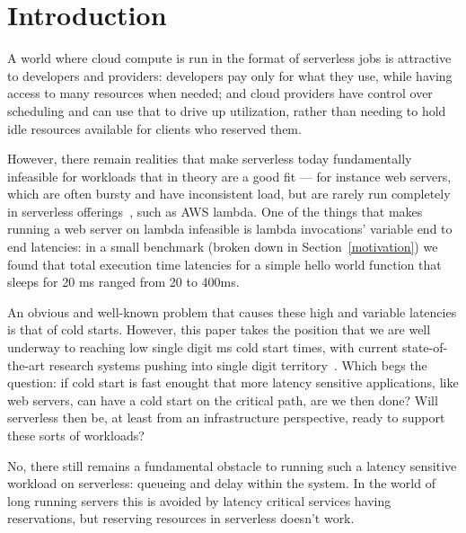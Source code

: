 \section{Introduction}

A world where cloud compute is run in the format of serverless jobs is
attractive to developers and providers: developers pay only for what they use,
while having access to many resources when needed; and cloud providers have
control over scheduling and can use that to drive up utilization, rather than
needing to hold idle resources available for clients who reserved them.


However, there remain realities that make serverless today fundamentally
infeasible for workloads that in theory are a good fit --- for instance web
servers, which are often bursty and have inconsistent load, but are rarely run
completely in serverless offerings~\cite{reddit-serverless1}, such as AWS lambda.
One of the things that makes running a web server on lambda infeasible is lambda
invocations' variable end to end latencies: in a small benchmark (broken down in
Section~\ref{motivation}) we found that total execution time latencies for a
simple hello world function that sleeps for 20 ms ranged from 20 to 400ms.

An obvious and well-known problem that causes these high and variable latencies
is that of cold starts. However, this paper takes the position that we are well
underway to reaching low single digit ms cold start times, with current
state-of-the-art research systems pushing into single digit
territory~\cite{sigmaos,mitosis}. Which begs the question: if cold start is fast enought
that more latency sensitive applications, like web servers, can have a cold
start on the critical path, are we then done? Will serverless then be, at least
from an infrastructure perspective, ready to support these sorts of workloads?

No, there still remains a fundamental obstacle to running such a latency
sensitive workload on serverless: queueing and delay within the system. In the
world of long running servers this is avoided by latency critical services
having reservations, but reserving resources in serverless doesn't work. 


